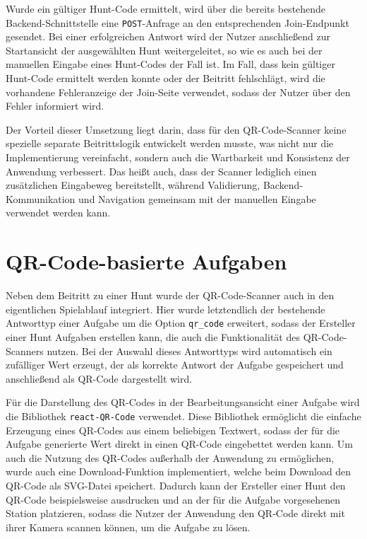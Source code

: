 ﻿\documentclass[oneside]{ausarbeitung}
\begin{document}
Wurde ein gültiger Hunt-Code ermittelt, wird über die bereits bestehende Backend-Schnittstelle eine \texttt{POST}-Anfrage an den entsprechenden 
Join-Endpunkt gesendet. Bei einer erfolgreichen Antwort wird der Nutzer anschließend zur Startansicht der ausgewählten Hunt weitergeleitet, so
wie es auch bei der manuellen Eingabe eines Hunt-Codes der Fall ist. Im Fall, dass kein gültiger Hunt-Code ermittelt werden konnte oder der
Beitritt fehlschlägt, wird die vorhandene Fehleranzeige der Join-Seite verwendet, sodass der Nutzer über den Fehler informiert wird.

Der Vorteil dieser Umsetzung liegt darin, dass für den QR-Code-Scanner keine spezielle separate Beitrittslogik entwickelt werden musste, was
nicht nur die Implementierung vereinfacht, sondern auch die Wartbarkeit und Konsistenz der Anwendung verbessert. Das heißt auch, dass der Scanner 
lediglich einen zusätzlichen Eingabeweg bereitstellt, während Validierung, Backend-Kommunikation und Navigation gemeinsam mit der manuellen Eingabe
verwendet werden kann. 


\section{QR-Code-basierte Aufgaben}
\label{sec:implementierung-qr-aufgaben}

Neben dem Beitritt zu einer Hunt wurde der QR-Code-Scanner auch in den eigentlichen Spielablauf integriert. Hier wurde letztendlich der
bestehende Antworttyp einer Aufgabe um die Option \texttt{qr\_code} erweitert, sodass der Ersteller einer Hunt Aufgaben erstellen kann, die auch
die Funktionalität des QR-Code-Scanners nutzen. Bei der Auswahl dieses Antworttyps wird automatisch ein zufälliger Wert erzeugt, der als korrekte 
Antwort der Aufgabe gespeichert und anschließend als QR-Code dargestellt wird.

Für die Darstellung des QR-Codes in der Bearbeitungsansicht einer Aufgabe wird die Bibliothek \texttt{react-QR-Code} verwendet. Diese Bibliothek
ermöglicht die einfache Erzeugung eines QR-Codes aus einem beliebigen Textwert, sodass der für die Aufgabe generierte Wert direkt in einen QR-Code
eingebettet werden kann. Um auch die Nutzung des QR-Codes außerhalb der Anwendung zu ermöglichen, wurde auch eine Download-Funktion implementiert, 
welche beim Download den QR-Code als SVG-Datei speichert. Dadurch kann der Ersteller einer Hunt den QR-Code beispielsweise ausdrucken und an der 
für die Aufgabe vorgesehenen Station platzieren, sodass die Nutzer der Anwendung den QR-Code direkt mit ihrer Kamera scannen können, um die Aufgabe 
zu lösen.
\end{document}
